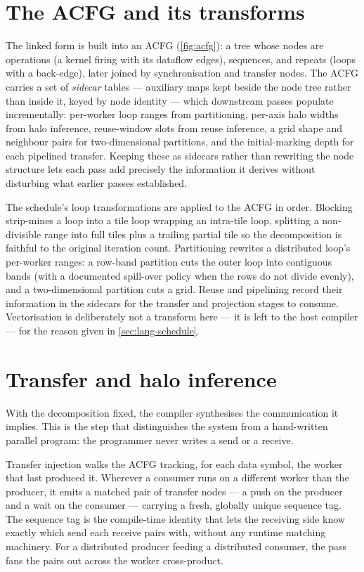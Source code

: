 \section{The ACFG and its transforms}\label{sec:arch-acfg}

The linked form is built into an ACFG (\cref{fig:acfg}): a tree whose nodes are
operations (a kernel firing with its dataflow edges), sequences, and repeats
(loops with a back-edge), later joined by synchronisation and transfer nodes. The
ACFG carries a set of \emph{sidecar} tables --- auxiliary maps kept beside the
node tree rather than inside it, keyed by node identity --- which downstream
passes populate incrementally: per-worker loop ranges from partitioning, per-axis halo widths
from halo inference, reuse-window slots from reuse inference, a grid shape and
neighbour pairs for two-dimensional partitions, and the initial-marking depth for
each pipelined transfer. Keeping these as sidecars rather than rewriting the node
structure lets each pass add precisely the information it derives without
disturbing what earlier passes established.



The schedule's loop transformations are applied to the ACFG in order. Blocking
strip-mines a loop into a tile loop wrapping an intra-tile loop, splitting a
non-divisible range into full tiles plus a trailing partial tile so the
decomposition is faithful to the original iteration count. Partitioning rewrites a
distributed loop's per-worker ranges: a row-band partition cuts the outer loop
into contiguous bands (with a documented spill-over policy when the rows do not
divide evenly), and a two-dimensional partition cuts a grid. Reuse and pipelining
record their information in the sidecars for the transfer and projection stages to
consume. Vectorisation is deliberately not a transform here --- it is left to the
host compiler --- for the reason given in \cref{sec:lang-schedule}.

\section{Transfer and halo inference}\label{sec:arch-transfer}

With the decomposition fixed, the compiler synthesises the communication it
implies. This is the step that distinguishes the system from a hand-written
parallel program: the programmer never writes a send or a receive.

Transfer injection walks the ACFG tracking, for each data symbol, the worker that
last produced it. Wherever a consumer runs on a different worker than the
producer, it emits a matched pair of transfer nodes --- a push on the producer
and a wait on the consumer --- carrying a fresh, globally unique sequence tag. The
sequence tag is the compile-time identity that lets the receiving side know
exactly which send each receive pairs with, without any runtime matching
machinery. For a distributed producer feeding a distributed consumer, the pass
fans the pairs out across the worker cross-product.

